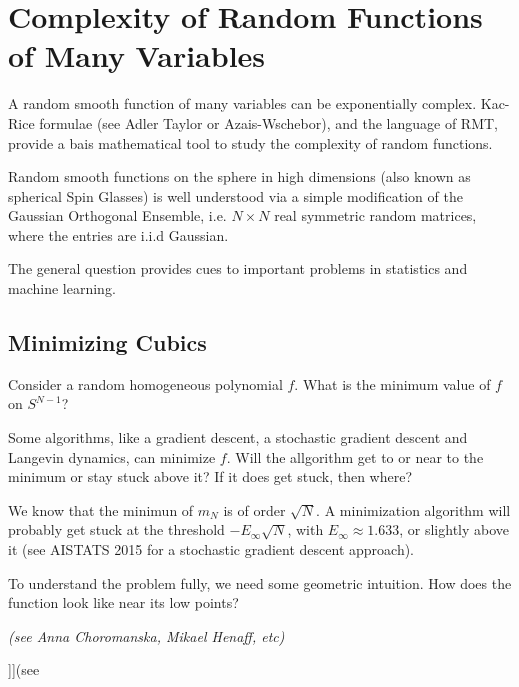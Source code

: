 \documentclass[11pt]{scrartcl}
\begin{document}
\section{Complexity of Random Functions of Many Variables}

A random smooth function of many variables can be exponentially
complex. Kac-Rice formulae (see Adler Taylor or Azais-Wschebor), and
the language of RMT, provide a bais mathematical tool to study the
complexity of random functions.

Random smooth functions on the sphere in high dimensions (also known as spherical Spin Glasses) is well understood via a simple modification of the Gaussian Orthogonal Ensemble, i.e. $N\times N$ real symmetric random matrices, where the entries are i.i.d Gaussian.

The general question provides cues to important problems in statistics and machine learning.

\subsection{Minimizing Cubics}

Consider  a random homogeneous polynomial $f$. What is the minimum value of $f$ on $S^{N-1}$?

Some algorithms, like a gradient descent, a stochastic gradient
descent and Langevin dynamics, can minimize $f$. Will the allgorithm
get to or near to the minimum or stay stuck above it? If it does get
stuck, then where?

We know that the minimun of $m_N$ is of order $\sqrt{N}$. A
minimization algorithm will probably get stuck at the threshold
$-E_{\infty}\sqrt{N}$, with $E_{\infty} \approx 1.633$, or slightly
above it (see AISTATS 2015 for a stochastic gradient descent
approach).

To understand the problem fully, we need some geometric intuition. How does the function look like near its low points?

\textit{(see Anna Choromanska, Mikael Henaff, etc)}

]](see \subsection{}
\end{document}
